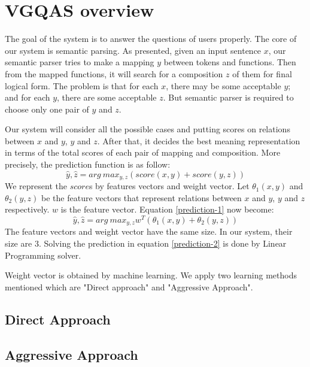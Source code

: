 \section{VGQAS overview}
\label{sec:system-overview}
The goal of the system is to answer the questions of users properly. The core of our system is semantic parsing. As presented, given an input sentence $x$, our semantic parser tries to make a mapping $y$ between tokens and functions. Then from the mapped functions, it will search for a composition $z$ of them for final logical form. The problem is that for each $x$, there may be some acceptable $y$; and for each $y$, there are some acceptable $z$. But semantic parser is required to choose only one pair of $y$ and $z$. 

Our system will consider all the possible cases and putting scores on relations between $x$ and $y$, $y$ and $z$. After that, it decides the best meaning representation in terms of the total scores of each pair of  mapping and composition. More precisely, the prediction function is as follow:
\begin{equation}
\label{prediction-1}
\hat{y}, \hat{z} = arg \ max_{y,z} (score(x, y) + score(y,z) )
\end{equation}
We represent the $score$s by features vectors and weight vector. Let $\theta_1(x, y)$ and $\theta_2(y,z)$ be the feature vectors that represent relations between $x$ and $y$, $y$ and $z$ respectively. $w$ is the feature vector. Equation \ref{prediction-1} now become:
\begin{equation}
\label{prediction-2}
\hat{y}, \hat{z} = arg \ max_{y,z} w^T(\theta_1(x, y) + \theta_2(y,z) )
\end{equation}
The feature vectors and weight vector have the same size. In our system, their size are $3$. Solving the prediction in equation \ref{prediction-2} is done by Linear Programming solver. 

Weight vector is obtained by machine learning. We apply two learning methods mentioned \cite{Clarke:2010:DSP:1870568.1870571} which are "Direct approach" and "Aggressive Approach".

\subsection{Direct Approach}

\subsection{Aggressive Approach}